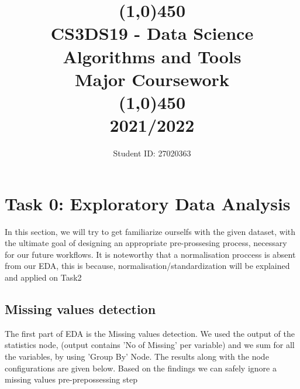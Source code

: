 \documentclass[11pt]{article}
\title{\line(1,0){450}\\ CS3DS19 - Data Science Algorithms and Tools \\ \large{Major Coursework }  \\\line(1,0){450} \\2021/2022}
\author{Student ID: 27020363}
\begin{document}
	\maketitle
	\pagebreak
	
	\section*{Task 0: Exploratory Data Analysis}
		In this section, we will try to get familiarize ourselfs with the given dataset, with the ultimate goal of designing an appropriate pre-prossesing process, necessary for our future workflows. It is noteworthy that a normalisation proccess is absent from our EDA, this is because, normalisation/standardization will be explained and applied on Task2
		\subsection*{Missing values detection}
			The first part of EDA is the Missing values detection. We used the output of the statistics node, (output contains 'No of Missing' per variable) and we sum for all the variables, by using 'Group By' Node. The results along with the node configurations are given below. Based on the findings we can safely ignore a missing values pre-prepossessing step

\end{document}
